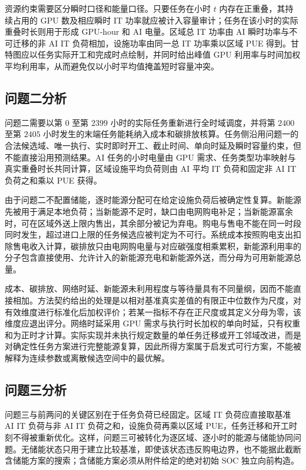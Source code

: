 资源约束需要区分瞬时口径和能量口径。只要任务在小时 $t$ 内存在正重叠，其持续占用的 GPU 数及相应瞬时 IT 功率就应被计入容量审计；任务在该小时的实际重叠时长则用于形成 GPU-hour 和 AI 电量。区域总 IT 功率由 AI 瞬时功率与不可迁移的非 AI IT 负荷相加，设施功率由同一总 IT 功率乘以区域 PUE 得到。甘特图应以任务实际开工和完成时点绘制，并同时给出峰值 GPU 利用率与时间加权平均利用率，从而避免仅以小时平均值掩盖短时容量冲突。

\subsection{问题二分析}

问题二需要以第 $0$ 至第 $2399$ 小时的实际任务重新进行全时域调度，并将第 $2400$ 至第 $2405$ 小时发生的末端任务能耗纳入成本和碳排放核算。任务侧沿用问题一的合法候选域、唯一执行、实时即时开工、截止时间、单向时延及瞬时容量约束，但不能直接沿用预测结果。AI 任务的小时电量由 GPU 需求、任务类型功率映射与真实重叠时长共同计算，区域设施平均负荷则由 AI 平均 IT 负荷和固定非 AI IT 负荷之和乘以 PUE 获得。

由于问题二不配置储能，逐时能源分配可在给定设施负荷后被确定性复算。新能源先被用于满足本地负荷；当新能源不足时，缺口由电网购电补足；当新能源富余时，可在区域外送上限内售出，其余部分被记为弃电。购电与售电不能在同一时段同时发生，超过进口上限的任务候选应被判定为不可行。系统成本按照购电支出扣除售电收入计算，碳排放只由电网购电量与对应碳强度相乘累积，新能源利用率的分子包含直接使用、允许计入的新能源充电和新能源外送，而分母为可用新能源总量。

成本、碳排放、网络时延、新能源未利用程度与等待量具有不同量纲，因而不能直接相加。方法契约给出的处理是以相对基准真实差值的有限正中位数作为尺度，对有效维度进行标准化后加权评价；若某一指标不存在正尺度或其定义分母为零，该维度应退出评分。网络时延采用 GPU 需求与执行时长加权的单向时延，只有权重和为正时才计算。实际实现并未执行规定数量的单任务迁移或开工邻域改进，而是对确定性任务方案进行完整能源复算，因此所得方案属于启发式可行方案，不能被解释为连续参数或离散候选空间中的最优解。

\subsection{问题三分析}

问题三与前两问的关键区别在于任务负荷已经固定。区域 IT 负荷应直接取基准 AI IT 负荷与非 AI IT 负荷之和，设施负荷再乘以区域 PUE，任务迁移和开工时刻不得被重新优化。这样，问题三可被转化为逐区域、逐小时的能源与储能协同问题。无储能状态只用于建立比较基准，即使该状态违反购电边界，也不能据此截断含储能方案的搜索；含储能方案必须从附件给定的绝对初始 SOC 独立向前构造。


